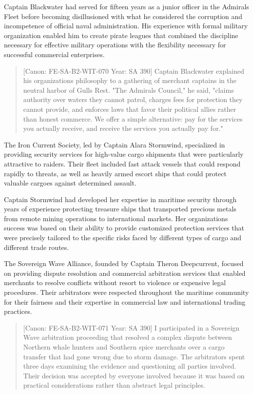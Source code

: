 Captain Blackwater had served for fifteen years as a junior officer in
the Admiral\textquotesingle s Fleet before becoming disillusioned with
what he considered the corruption and incompetence of official naval
administration. His experience with formal military organization enabled
him to create pirate leagues that combined the discipline necessary for
effective military operations with the flexibility necessary for
successful commercial enterprises.

\begin{quote}
{[}Canon: FE-SA-B2-WIT-070 \textbar{} Year: SA 390{]} Captain Blackwater
explained his organization\textquotesingle s philosophy to a gathering
of merchant captains in the neutral harbor of Gull\textquotesingle s
Rest. "The Admiral\textquotesingle s Council," he said, "claims
authority over waters they cannot patrol, charges fees for protection
they cannot provide, and enforces laws that favor their political allies
rather than honest commerce. We offer a simple alternative: pay for the
services you actually receive, and receive the services you actually pay
for."
\end{quote}

The Iron Current Society, led by Captain Alara Stormwind, specialized in
providing security services for high-value cargo shipments that were
particularly attractive to raiders. Their fleet included fast attack
vessels that could respond rapidly to threats, as well as heavily armed
escort ships that could protect valuable cargoes against determined
assault.

Captain Stormwind had developed her expertise in maritime security
through years of experience protecting treasure ships that transported
precious metals from remote mining operations to international markets.
Her organization\textquotesingle s success was based on their ability to
provide customized protection services that were precisely tailored to
the specific risks faced by different types of cargo and different trade
routes.

The Sovereign Wave Alliance, founded by Captain Theron Deepcurrent,
focused on providing dispute resolution and commercial arbitration
services that enabled merchants to resolve conflicts without resort to
violence or expensive legal procedures. Their arbitrators were respected
throughout the maritime community for their fairness and their expertise
in commercial law and international trading practices.

\begin{quote}
{[}Canon: FE-SA-B2-WIT-071 \textbar{} Year: SA 390{]} I participated in
a Sovereign Wave arbitration proceeding that resolved a complex dispute
between Northern whale hunters and Southern spice merchants over a cargo
transfer that had gone wrong due to storm damage. The arbitrators spent
three days examining the evidence and questioning all parties involved.
Their decision was accepted by everyone involved because it was based on
practical considerations rather than abstract legal principles.
\end{quote}

